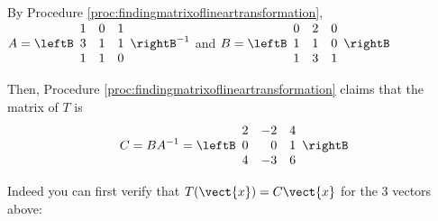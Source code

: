 \begin{solution}
By Procedure \ref{proc:findingmatrixoflineartransformation}, 
$A=  \leftB
\begin{array}{rrr}
1 & 0 & 1 \\
3 & 1 & 1 \\
1 & 1 & 0
\end{array}
\rightB ^{-1}$ and 
 $B=\leftB
\begin{array}{rrr}
0 & 2 & 0 \\
1 & 1 & 0 \\
1 & 3 & 1
\end{array}
\rightB$

Then, Procedure \ref{proc:findingmatrixoflineartransformation} claims that the matrix of $T$ is 
\begin{equation*}
C= BA^{-1} 
=\leftB
\begin{array}{rrr}
2 & -2 & 4 \\
0 & 0 & 1 \\
4 & -3 & 6
\end{array}
\rightB
\end{equation*}

Indeed you can first verify that $T(\vect{x})=C\vect{x}$ for the 3 vectors above:


\end{solution}
